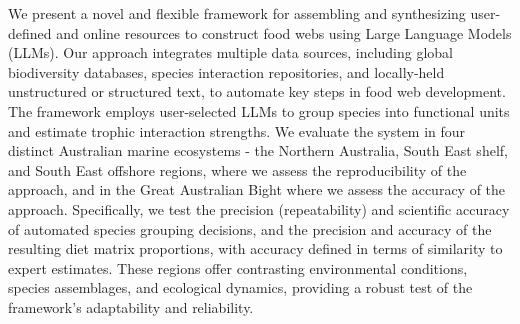 We present a novel and flexible framework for assembling and synthesizing user-defined and online resources to construct food webs using Large Language Models (LLMs). Our approach integrates multiple data sources, including global biodiversity databases, species interaction repositories, and locally-held unstructured or structured text, to automate key steps in food web development. The framework employs user-selected LLMs to group species into functional units and estimate trophic interaction strengths. We evaluate the system in four distinct Australian marine ecosystems - the Northern Australia, South East shelf, and South East offshore regions, where we assess the reproducibility of the approach, and in the Great Australian Bight where we assess the accuracy of the approach. Specifically, we test the precision (repeatability) and scientific accuracy of automated species grouping decisions, and the precision and accuracy of the resulting diet matrix proportions, with accuracy defined in terms of similarity to expert estimates. These regions offer contrasting environmental conditions, species assemblages, and ecological dynamics, providing a robust test of the framework's adaptability and reliability.


